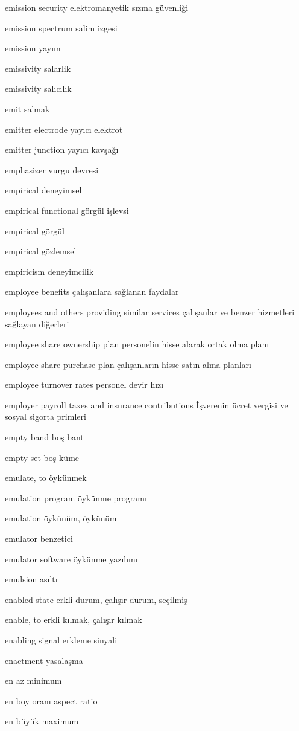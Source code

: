 \documentclass[12pt,fleqn]{article}\usepackage{../../common}
\begin{document}
emission security elektromanyetik sızma güvenliği

emission spectrum salim izgesi

emission yayım

emissivity salarlik

emissivity salıcılık

emit salmak

emitter electrode yayıcı elektrot

emitter junction yayıcı kavşağı

emphasizer vurgu devresi

empirical deneyimsel

empirical functional görgül işlevsi

empirical görgül

empirical gözlemsel

empiricism deneyimcilik

employee benefits çalışanlara sağlanan faydalar

employees and others providing similar services çalışanlar ve benzer hizmetleri sağlayan diğerleri

employee share ownership plan personelin hisse alarak ortak olma planı

employee share purchase plan çalışanların hisse satın alma planları

employee turnover rates personel devir hızı

employer payroll taxes and insurance contributions İşverenin ücret vergisi ve sosyal sigorta primleri

empty band boş bant

empty set boş küme

emulate, to öykünmek

emulation program öykünme programı

emulation öykünüm, öykünüm

emulator benzetici

emulator software öykünme yazılımı

emulsion asıltı

enabled state erkli durum, çalışır durum, seçilmiş

enable, to erkli kılmak, çalışır kılmak

enabling signal erkleme sinyali

enactment yasalaşma

en az minimum

en boy oranı aspect ratio

en büyük maximum
\end{document}
